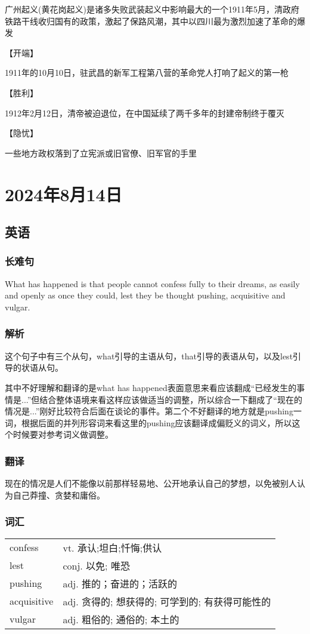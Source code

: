 \documentclass[UTF8]{ctexart}
\begin{document}
广州起义(黄花岗起义)是诸多失败武装起义中影响最大的一个1911年5月，清政府铁路干线收归国有的政策，激起了保路风潮，其中以四川最为激烈加速了革命的爆发

【开端】

1911年的10月10日，驻武昌的新军工程第八营的革命党人打响了起义的第一枪

【胜利】

1912年2月12日，清帝被迫退位，在中国延续了两千多年的封建帝制终于覆灭

【隐忧】

一些地方政权落到了立宪派或旧官僚、旧军官的手里
\section{2024年8月14日}
\subsection{英语}
\subsubsection{长难句}
What has happened is that people cannot confess fully to their dreams, as easily and openly as once they could, lest they be thought pushing, acquisitive and vulgar.
\subsubsection{解析}
这个句子中有三个从句，what引导的主语从句，that引导的表语从句，以及lest引导的状语从句。

其中不好理解和翻译的是what has happened表面意思来看应该翻成“已经发生的事情是...”但结合整体语境来看这样应该做适当的调整，所以综合一下翻成了“现在的情况是...”刚好比较符合后面在谈论的事件。第二个不好翻译的地方就是pushing一词，根据后面的并列形容词来看这里的pushing应该翻译成偏贬义的词义，所以这个时候要对参考词义做调整。

\subsubsection{翻译}
现在的情况是人们不能像以前那样轻易地、公开地承认自己的梦想，以免被别人认为自己莽撞、贪婪和庸俗。
\newpage
\subsubsection{词汇}
\begin{table}[h]
      \centering
      \begin{tabular}{p{}p{}}
            confess     & vt. 承认;坦白;忏悔;供认               \\
            lest        & conj. 以免; 唯恐                  \\
            pushing     & adj. 推的；奋进的；活跃的               \\
            acquisitive & adj. 贪得的; 想获得的; 可学到的; 有获得可能性的 \\
            vulgar      & adj. 粗俗的; 通俗的; 本土的
      \end{tabular}
\end{table}
\end{document}
